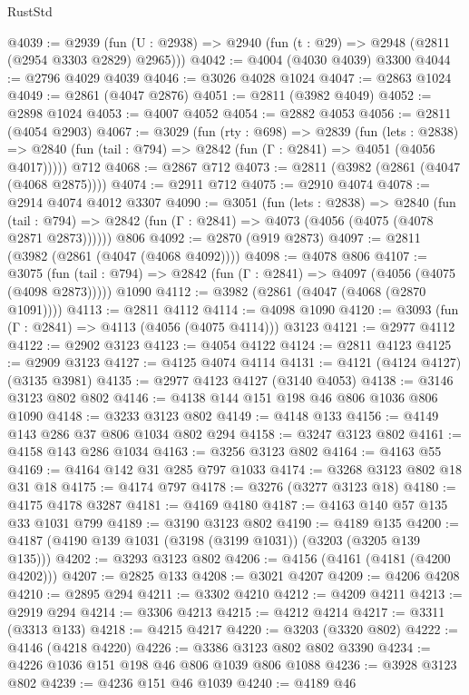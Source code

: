 \begin{lexlean}{RustStd}
\begin{coremodule}
{\begin{coremodule}
{{{{{{{{{{{{{{{@4039 := @2939 (fun (U : @2938) => @2940 (fun (t : @29) => @2948 (@2811 (@2954 @3303 @2829) @2965)))
@4042 := @4004 (@4030 @4039) @3300
@4044 := @2796 @4029 @4039
@4046 := @3026 @4028 @1024
@4047 := @2863 @1024
@4049 := @2861 (@4047 @2876)
@4051 := @2811 (@3982 @4049)
@4052 := @2898 @1024
@4053 := @4007 @4052
@4054 := @2882 @4053
@4056 := @2811 (@4054 @2903)
@4067 := @3029
    (fun (rty : @698) =>
    @2839
      (fun (lets : @2838) =>
      @2840 (fun (tail : @794) => @2842 (fun (Γ : @2841) => @4051 (@4056 @4017)))))
    @712
@4068 := @2867 @712
@4073 := @2811 (@3982 (@2861 (@4047 (@4068 @2875))))
@4074 := @2911 @712
@4075 := @2910 @4074
@4078 := @2914 @4074 @4012 @3307
@4090 := @3051
    (fun (lets : @2838) =>
    @2840
      (fun (tail : @794) => @2842 (fun (Γ : @2841) => @4073 (@4056 (@4075 (@4078 @2871 @2873))))))
    @806
@4092 := @2870 (@919 @2873)
@4097 := @2811 (@3982 (@2861 (@4047 (@4068 @4092))))
@4098 := @4078 @806
@4107 := @3075
    (fun (tail : @794) => @2842 (fun (Γ : @2841) => @4097 (@4056 (@4075 (@4098 @2873)))))
    @1090
@4112 := @3982 (@2861 (@4047 (@4068 (@2870 @1091))))
@4113 := @2811 @4112
@4114 := @4098 @1090
@4120 := @3093 (fun (Γ : @2841) => @4113 (@4056 (@4075 @4114))) @3123
@4121 := @2977 @4112
@4122 := @2902 @3123
@4123 := @4054 @4122
@4124 := @2811 @4123
@4125 := @2909 @3123
@4127 := @4125 @4074 @4114
@4131 := @4121 (@4124 @4127) (@3135 @3981)
@4135 := @2977 @4123 @4127 (@3140 @4053)
@4138 := @3146 @3123 @802 @802
@4146 := @4138 @144 @151 @198 @46 @806 @1036 @806 @1090
@4148 := @3233 @3123 @802
@4149 := @4148 @133
@4156 := @4149 @143 @286 @37 @806 @1034 @802 @294
@4158 := @3247 @3123 @802
@4161 := @4158 @143 @286 @1034
@4163 := @3256 @3123 @802
@4164 := @4163 @55
@4169 := @4164 @142 @31 @285 @797 @1033
@4174 := @3268 @3123 @802 @18 @31 @18
@4175 := @4174 @797
@4178 := @3276 (@3277 @3123 @18)
@4180 := @4175 @4178 @3287
@4181 := @4169 @4180
@4187 := @4163 @140 @57 @135 @33 @1031 @799
@4189 := @3190 @3123 @802
@4190 := @4189 @135
@4200 := @4187 (@4190 @139 @1031 (@3198 (@3199 @1031)) (@3203 (@3205 @139 @135)))
@4202 := @3293 @3123 @802
@4206 := @4156 (@4161 (@4181 (@4200 @4202)))
@4207 := @2825 @133
@4208 := @3021 @4207
@4209 := @4206 @4208
@4210 := @2895 @294
@4211 := @3302 @4210
@4212 := @4209 @4211
@4213 := @2919 @294
@4214 := @3306 @4213
@4215 := @4212 @4214
@4217 := @3311 (@3313 @133)
@4218 := @4215 @4217
@4220 := @3203 (@3320 @802)
@4222 := @4146 (@4218 @4220)
@4226 := @3386 @3123 @802 @802 @3390
@4234 := @4226 @1036 @151 @198 @46 @806 @1039 @806 @1088
@4236 := @3928 @3123 @802
@4239 := @4236 @151 @46 @1039
@4240 := @4189 @46
}}}}}}}}}}}}}}}
\end{coremodule}}
\end{coremodule}
\end{lexlean}
